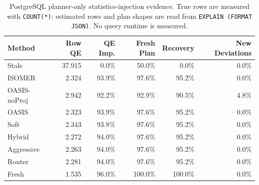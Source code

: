 \begin{table}[t]
  \centering
  \small
  \caption{PostgreSQL planner-only statistics-injection evidence. True rows are measured with \texttt{COUNT(*)}; estimated rows and plan shapes are read from \texttt{EXPLAIN (FORMAT JSON)}. No query runtime is measured.}
  \label{tab:postgres_planner_stats_injection}
  \setlength{\tabcolsep}{4pt}
  \begin{tabular}{lrrrrr}
    \toprule
    Method & Row QE & QE Imp. & Fresh Plan & Recovery & New Deviations \\
    \midrule
    Stale & 37.915 & 0.0\% & 50.0\% & 0.0\% & 0.0\% \\
    ISOMER & 2.324 & 93.9\% & 97.6\% & 95.2\% & 0.0\% \\
    OASIS-noProj & 2.942 & 92.2\% & 92.9\% & 90.5\% & 4.8\% \\
    OASIS & 2.323 & 93.9\% & 97.6\% & 95.2\% & 0.0\% \\
    Soft & 2.343 & 93.8\% & 97.6\% & 95.2\% & 0.0\% \\
    Hybrid & 2.272 & 94.0\% & 97.6\% & 95.2\% & 0.0\% \\
    Aggressive & 2.263 & 94.0\% & 97.6\% & 95.2\% & 0.0\% \\
    Router & 2.281 & 94.0\% & 97.6\% & 95.2\% & 0.0\% \\
    Fresh & 1.535 & 96.0\% & 100.0\% & 100.0\% & 0.0\% \\
    \bottomrule
  \end{tabular}
\end{table}
